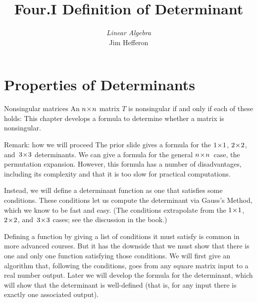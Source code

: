 \documentclass[10pt,t]{beamer}
\title[Determinants] %
{Four.I Definition of Determinant}
\author{\textit{Linear Algebra} \\ {\small Jim Hef{}feron}}
\institute{
  \texttt{http://joshua.smcvt.edu/linearalgebra}
}
\date{}
\begin{document}
\begin{frame}
  \titlepage
\end{frame}




\section{Properties of Determinants}
\begin{frame}{Nonsingular matrices}
\noindent An \( n \! \times \! n \) matrix \( T \) is nonsingular if and only if
each of these holds:%
This chapter develops a formula to determine whether a
matrix is nonsingular.
\end{frame}




\begin{frame}
\end{frame}




\begin{frame}{Remark: how we will proceed}
The prior slide gives a formula for the $1 \! \times \! 1$, $2 \! \times \! 2$, and~$3 \! \times \! 3$
determinants. 
We can give a formula for the general $n \! \times \! n$~case,
the permutation expansion.
However, this formula has a number of disadvantages, including 
its complexity and that 
it is too slow for practical computations. 

Instead, we will define a
determinant function as one that satisfies some conditions. 
These conditions let us compute the determinant via Gauss's Method, 
which we know to be fast and easy.
(The conditions extrapolate from the $1 \! \times \! 1$, $2 \! \times \! 2$, 
and~$3 \! \times \! 3$ cases; see the discussion in the book.) 

Defining a function by giving a list of conditions it must satisfy is 
common in more advanced courses. 
But it has the downside that we must 
show that there is one and only one function satisfying those conditions.
We will first give an algorithm that, following the conditions, goes from 
any square matrix input to a real number output.
Later we will develop the formula for the determinant, which will
show that the determinant is well-defined (that is, 
for any input there is exactly one associated output). 
\end{frame}
\end{document}
